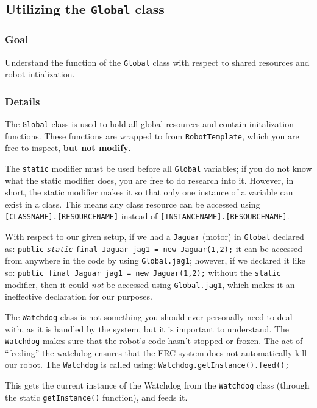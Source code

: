 \documentclass[a4paper]{article}
\begin{document}
\pagebreak\subsection{Utilizing the \lstinline{Global} class}
\subsubsection{Goal} Understand the function of the \lstinline{Global} class with respect to shared resources and robot intialization.
\subsubsection{Details} The \lstinline{Global} class is used to hold all global resources and contain initalization functions. These functions are wrapped to from \lstinline{RobotTemplate}, which you are free to inspect, \textbf{but not modify}.

The \lstinline{static} modifier must be used before all \lstinline{Global} variables; if you do not know what the static modifier does, you are free to do research into it. However, in short, the static modifier makes it so that only one instance of a variable can exist in a class. This means any class resource can be accessed using \lstinline{[CLASSNAME].[RESOURCENAME]} instead of \lstinline{[INSTANCENAME].[RESOURCENAME]}.

With respect to our given setup, if we had a \lstinline{Jaguar} (motor) in \lstinline{Global} declared as: \lstinline{public} \textit{\lstinline{static}} \lstinline{final Jaguar jag1 = new Jaguar(1,2);} it can be accessed from anywhere in the code by using \lstinline{Global.jag1}; however, if we declared it like so: \lstinline{public final Jaguar jag1 = new Jaguar(1,2);} without the \lstinline{static} modifier, then it could \textit{not} be accessed using \lstinline{Global.jag1}, which makes it an ineffective declaration for our purposes.

The \lstinline{Watchdog} class is not something you should ever personally need to deal with, as it is handled by the system, but it is important to understand. The \lstinline{Watchdog} makes sure that the robot's code hasn't stopped or frozen. The act of ``feeding'' the watchdog ensures that the FRC system does not automatically kill our robot. The \lstinline{Watchdog} is called using: \lstinline{Watchdog.getInstance().feed();}

This gets the current instance of the Watchdog from the \lstinline{Watchdog} class (through the static \lstinline{getInstance()} function), and feeds it.
\end{document}
